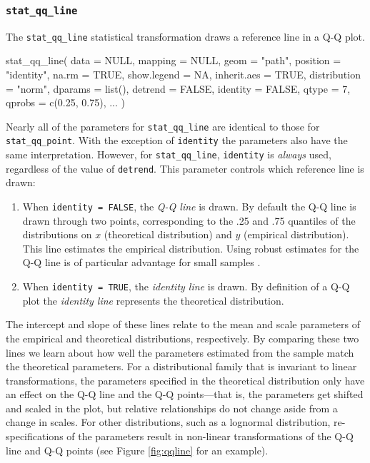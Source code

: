\subsubsection{\texorpdfstring{\texttt{stat\_qq\_line}}{stat\_qq\_line}}\label{stat_qq_line}

The \texttt{stat\_qq\_line} statistical transformation draws a reference
line in a Q-Q plot.

\begin{Schunk}
\begin{Sinput}
stat_qq_line(
  data = NULL,
  mapping = NULL,
  geom = "path",
  position = "identity",
  na.rm = TRUE,
  show.legend = NA,
  inherit.aes = TRUE,
  distribution = "norm",
  dparams = list(),
  detrend = FALSE,
  identity = FALSE,
  qtype = 7,
  qprobs = c(0.25, 0.75),
  ...
  )
\end{Sinput}
\end{Schunk}

Nearly all of the parameters for \texttt{stat\_qq\_line} are identical
to those for \texttt{stat\_qq\_point}. With the exception of
\texttt{identity} the parameters also have the same interpretation.
However, for \texttt{stat\_qq\_line}, \texttt{identity} is \emph{always}
used, regardless of the value of \texttt{detrend}. This parameter
controls which reference line is drawn:

\begin{enumerate}
\def\labelenumi{\alph{enumi})}
\setcounter{enumi}{1}
\tightlist
\item
  When \texttt{identity\ =\ FALSE}, the \emph{Q-Q line} is drawn. By
  default the Q-Q line is drawn through two points, corresponding to the
  .25 and .75 quantiles of the distributions on \(x\) (theoretical
  distribution) and \(y\) (empirical distribution). This line estimates
  the empirical distribution. Using robust estimates for the Q-Q line is
  of particular advantage for small samples \citep{Loy2016-fg}.
\item
  When \texttt{identity\ =\ TRUE}, the \emph{identity line} is drawn. By
  definition of a Q-Q plot the \emph{identity line} represents the
  theoretical distribution.
\end{enumerate}

The intercept and slope of these lines relate to the mean and scale
parameters of the empirical and theoretical distributions, respectively.
By comparing these two lines we learn about how well the parameters
estimated from the sample match the theoretical parameters. For a
distributional family that is invariant to linear transformations, the
parameters specified in the theoretical distribution only have an effect
on the Q-Q line and the Q-Q points---that is, the parameters get shifted
and scaled in the plot, but relative relationships do not change aside
from a change in scales. For other distributions, such as a lognormal
distribution, re-specifications of the parameters result in non-linear
transformations of the Q-Q line and Q-Q points (see Figure
\ref{fig:qqline} for an example).

